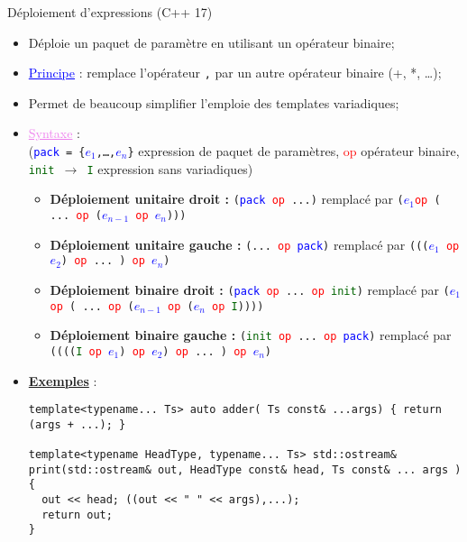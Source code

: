\documentclass[compress,10pt,aspectratio=169]{beamer}
\begin{document}
\begin{frame}[fragile]{Déploiement d'expressions (C++ 17)}
  \scriptsize

\begin{itemize}
\item Déploie un paquet de paramètre en utilisant un opérateur binaire;
\item \textcolor{blue}{\underline{Principe}} : remplace l'opérateur \texttt{,} par 
      un autre opérateur binaire (+, *, \ldots);
\item Permet de beaucoup simplifier l'emploie des templates variadiques;
\item \textcolor{violet}{\underline{Syntaxe}} :\\
(\texttt{\textcolor{blue}{pack} = \{\textcolor{blue}{$e_{1}$},\ldots,\textcolor{blue}{$e_{n}$}\}}
expression de paquet de paramètres, \textcolor{red}{op} opérateur binaire,
\texttt{\textcolor{DarkGreen}{init} $\rightarrow$ \textcolor{DarkGreen}{I}} expression sans variadiques)
\begin{itemize}
\scriptsize 
\item \textbf{Déploiement unitaire droit :} \texttt{(\textcolor{blue}{pack} 
\textcolor{red}{op} ...)} 
remplacé par \texttt{(\textcolor{blue}{$e_{1}$}\textcolor{red}{op} ( 
  ... \textcolor{red}{op} (\textcolor{blue}{$e_{n-1}$} \textcolor{red}{op}
  \textcolor{blue}{$e_{n}$})))}
\item \textbf{Déploiement unitaire gauche :} \texttt{(... \textcolor{red}{op} 
\textcolor{blue}{pack})} remplacé par 
\texttt{(((\textcolor{blue}{$e_{1}$} \textcolor{red}{op} \textcolor{blue}{$e_{2}$})  
\textcolor{red}{op} ... ) \textcolor{red}{op} \textcolor{blue}{$e_{n}$})}
\item \textbf{Déploiement binaire droit :} \texttt{(\textcolor{blue}{pack} 
\textcolor{red}{op} ... \textcolor{red}{op} \textcolor{DarkGreen}{init})}
remplacé par 
\texttt{(\textcolor{blue}{$e_{1}$} \textcolor{red}{op} ( ... \textcolor{red}{op} 
(\textcolor{blue}{$e_{n-1}$} \textcolor{red}{op} (\textcolor{blue}{$e_{n}$} 
\textcolor{red}{op} \textcolor{DarkGreen}{I}))))}
\item \textbf{Déploiement binaire gauche :} 
\texttt{(\textcolor{DarkGreen}{init} \textcolor{red}{op} ... 
\textcolor{red}{op} \textcolor{blue}{pack})}
remplacé par 
\texttt{((((\textcolor{DarkGreen}{I} \textcolor{red}{op} \textcolor{blue}{$e_{1}$})
\textcolor{red}{op} \textcolor{blue}{$e_{2}$}) \textcolor{red}{op} ... ) 
\textcolor{red}{op} \textcolor{blue}{$e_{n}$})}
\end{itemize}
\item \underline{\textcolor{NavyBlue}{\bf Exemples}} :
\begin{verbatim}
template<typename... Ts> auto adder( Ts const& ...args) { return (args + ...); }

template<typename HeadType, typename... Ts> std::ostream& 
print(std::ostream& out, HeadType const& head, Ts const& ... args ) {
  out << head; ((out << " " << args),...);
  return out;
}
\end{verbatim}
\end{itemize}
\end{frame}
\end{document}
